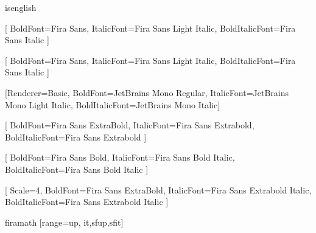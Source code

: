 \RequirePackage{microtype}
\RequirePackage{polyglossia}
\ifcsname isenglish\endcsname%
  \setdefaultlanguage{english}
\else
  \setdefaultlanguage{french}
\fi

\RequirePackage{fontspec}
\RequirePackage{amssymb}

[
  BoldFont={Fira Sans},
  ItalicFont={Fira Sans Light Italic},
  BoldItalicFont={Fira Sans Italic}
]

\setsansfont{Fira Sans Light}[
  BoldFont={Fira Sans},
  ItalicFont={Fira Sans Light Italic},
  BoldItalicFont={Fira Sans Italic}
]

\setmonofont{JetBrains Mono Light}[Renderer=Basic,
  BoldFont={JetBrains Mono Regular},
  ItalicFont={JetBrains Mono Light Italic},
  BoldItalicFont={JetBrains Mono Italic}]%

[
  BoldFont={Fira Sans ExtraBold},
  ItalicFont={Fira Sans Extrabold},
  BoldItalicFont={Fira Sans Extrabold}
]

[
  BoldFont={Fira Sans Bold},
  ItalicFont={Fira Sans Bold Italic},
  BoldItalicFont={Fira Sans Bold Italic}
]

[
  Scale=4,
  BoldFont={Fira Sans ExtraBold},
  ItalicFont={Fira Sans Extrabold Italic},
  BoldItalicFont={Fira Sans Extrabold Italic}
]

\ifcsname firamath\endcsname%
  \RequirePackage[math-style=french,bold-style=ISO]{unicode-math}
  [range={up, it,sfup,sfit}]
\fi

